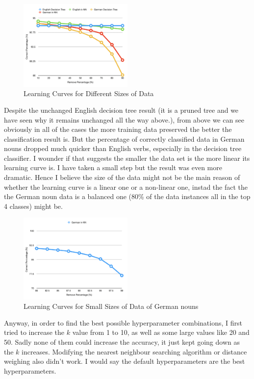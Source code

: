 \documentclass[11pt]{article} %
\begin{document}
\begin{figure}[h]
    \centering
    \includegraphics[width=0.5\textwidth]{images/performance_chart.png}
    \caption{Learning Curves for Different Sizes of Data}
\end{figure}

Despite the unchanged English decision tree result (it is a pruned tree and we have seen why it remains unchanged all the way above.), from above we can see obviously in all of the cases the more training data preserved the better the classification result is. But the percentage of correctly classified data in German nouns dropped much quicker than English verbs, especially in the decision tree classifier. I wounder if that suggests the smaller the data set is the more linear its learning curve is. I have taken a small step but the result was even more dramatic. Hence I believe the size of the data might not be the main reason of whether the learning curve is a linear one or a non-linear one, instad the fact the the German noun data is a balanced one (80\% of the data instances all in the top 4 classes) might be. 

\begin{figure}[h]
    \centering
    \includegraphics[width=0.5\textwidth]{images/performance_chart_2.png}
    \caption{Learning Curves for Small Sizes of Data of German nouns}
\end{figure}

Anyway, in order to find the best possible hyperparameter combinations, I first tried to increase the $k$ value from 1 to 10, as well as some large values like 20 and 50. Sadly none of them could increase the accuracy, it just kept going down as the $k$ increases. Modifying the nearest neighbour searching algorithm or distance weighing also didn't work. I would say the default hyperparameters are the best hyperparameters.
\end{document}
